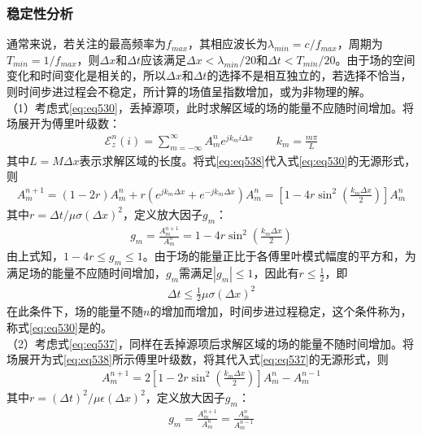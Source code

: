 \documentclass{article}
\numberwithin{equation}{section}
\begin{document}
\subsubsection{稳定性分析}
通常来说，若关注的最高频率为$f_{max}$，其相应波长为$\lambda_{min}=c/f_{max}$，周期为$T_{min}=1/f_{max}$，则$\Delta x$和$\Delta t$应该满足$\Delta x<\lambda_{min}/20$和$\Delta t<T_{min}/20$。由于场的空间变化和时间变化是相关的，所以$\Delta x$和$\Delta t$的选择不是相互独立的，若选择不恰当，则时间步进过程会不稳定，所计算的场值呈指数增加，或为非物理的解。\\
（1）考虑式\ref{eq:eq530}，丢掉源项，此时求解区域的场的能量不应随时间增加。将场展开为傅里叶级数：
\begin{align}
    \label{eq:eq538}
    \mathcal{E}_z^{n}(i)=\sum_{m=-\infty}^{\infty}A_m^ne^{jk_mi\Delta x}\qquad k_m=\frac{m\pi}{L}
\end{align}
其中$L=M\Delta x$表示求解区域的长度。将式\ref{eq:eq538}代入式\ref{eq:eq530}的无源形式，则
\begin{align}
    \label{eq:eq539}
    A_m^{n+1}=(1-2r)A_m^n+r(e^{jk_m\Delta x}+e^{-jk_m\Delta x})A_m^n=\left[1-4r\sin^2\left(\frac{k_m\Delta x}{2}\right)\right]A_m^n
\end{align}
其中$r=\Delta t/\mu\sigma(\Delta x)^2$，定义放大因子$g_m$：
\begin{align}
    \label{eq:eq540}
    g_m=\frac{A_m^{n+1}}{A_m^{n}}=1-4r\sin^2\left(\frac{k_m\Delta x}{2}\right)
\end{align}
由上式知，$1-4r\leq g_m\leq 1$。由于场的能量正比于各傅里叶模式幅度的平方和，为满足场的能量不应随时间增加，$g_m$需满足$|g_m|\leq 1$，因此有$r\leq\frac{1}{2}$，即
\begin{align}
    \label{eq:eq541}
    \Delta t\leq\frac{1}{2}\mu\sigma(\Delta x)^2
\end{align}
在此条件下，场的能量不随$n$的增加而增加，时间步进过程稳定，这个条件称为\textbf{\color{blue}{稳定性条件}}，称式\ref{eq:eq530}是\textbf{\color{blue}{有条件稳定}}的。 \\
（2）考虑式\ref{eq:eq537}，同样在丢掉源项后求解区域的场的能量不随时间增加。将场展开为式\ref{eq:eq538}所示傅里叶级数，将其代入式\ref{eq:eq537}的无源形式，则
\begin{align}
    \label{eq:eq542}
    A_m^{n+1}=2\left[1-2r\sin^2\left(\frac{k_m\Delta x}{2}\right)\right]A_m^n-A_m^{n-1}
\end{align}
其中$r=(\Delta t)^2/\mu\epsilon(\Delta x)^2$，定义放大因子$g_m$：
\begin{align}
    \label{eq:eq543}
    g_m=\frac{A_m^{n+1}}{A_m^{n}}=\frac{A_m^{n}}{A_m^{n-1}}
\end{align}
\end{document}
